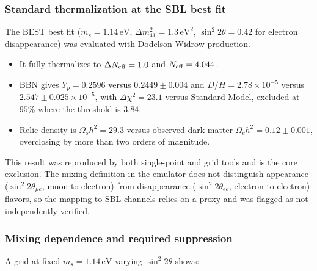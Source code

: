 \documentclass[11pt,a4paper]{article}
\begin{document}
\subsubsection{Standard thermalization at the SBL best fit}
The BEST best fit ($m_s = 1.14\,\mathrm{eV}$, $\Delta m^2_{41} = 1.3\,\mathrm{eV}^2$, $\sin^2 2\theta = 0.42$ for electron disappearance) was evaluated with Dodelson-Widrow production.

\begin{itemize}
  \item It fully thermalizes to $\Delta N_{\rm eff} = 1.0$ and $N_{\rm eff} = 4.044$.
  \item BBN gives $Y_p = 0.2596$ versus $0.2449 \pm 0.004$ and $D/H = 2.78 \times 10^{-5}$ versus $2.547 \pm 0.025 \times 10^{-5}$, with $\Delta \chi^2 = 23.1$ versus Standard Model, excluded at $95\%$ where the threshold is $3.84$.
  \item Relic density is $\Omega_s h^2 = 29.3$ versus observed dark matter $\Omega_c h^2 = 0.12 \pm 0.001$, overclosing by more than two orders of magnitude.
\end{itemize}
This result was reproduced by both single-point and grid tools and is the core exclusion. The mixing definition in the emulator does not distinguish appearance ($\sin^2 2\theta_{\mu e}$, muon to electron) from disappearance ($\sin^2 2\theta_{ee}$, electron to electron) flavors, so the mapping to SBL channels relies on a proxy and was flagged as not independently verified.

\subsubsection{Mixing dependence and required suppression}
A grid at fixed $m_s = 1.14\,\mathrm{eV}$ varying $\sin^2 2\theta$ shows:
\end{document}
